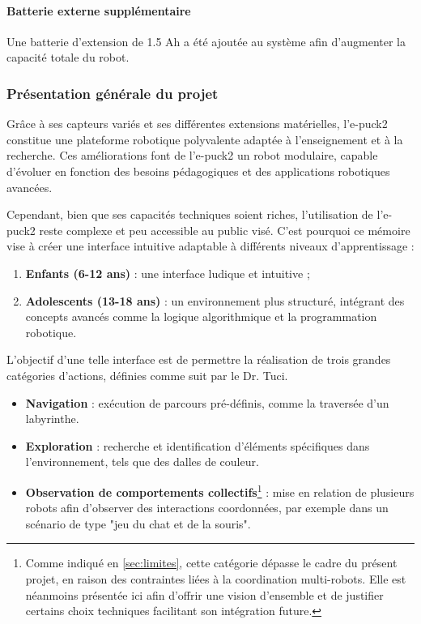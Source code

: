 \paragraph{Batterie externe supplémentaire}
Une batterie d'extension de 1.5 Ah a été ajoutée au système afin d'augmenter la capacité totale du robot.

\subsubsection{Présentation générale du projet}
Grâce à ses capteurs variés et ses différentes extensions matérielles, l'e-puck2 constitue une plateforme robotique polyvalente adaptée à l'enseignement et à la recherche.
Ces améliorations font de l'e-puck2 un robot modulaire, capable d'évoluer en fonction des besoins pédagogiques et des applications robotiques avancées.

Cependant, bien que ses capacités techniques soient riches, l'utilisation de l'e-puck2 reste complexe et peu accessible au public visé.
C'est pourquoi ce mémoire vise à créer une interface intuitive adaptable à différents niveaux d'apprentissage :
\begin{enumerate}
    \item \textbf{Enfants (6-12 ans)} : une interface ludique et intuitive ;
    \item \textbf{Adolescents (13-18 ans)} : un environnement plus structuré, intégrant des concepts avancés comme la logique algorithmique et la programmation robotique.
\end{enumerate}

L’objectif d'une telle interface est de permettre la réalisation de trois grandes catégories d’actions, définies comme suit par le Dr. Tuci.  

\begin{itemize}
    \item \textbf{Navigation} : exécution de parcours pré-définis, comme la traversée d’un labyrinthe.
    
    \item \textbf{Exploration} : recherche et identification d’éléments spécifiques dans l’environnement, tels que des dalles de couleur.
    
    \item \textbf{Observation de comportements collectifs}\footnote{Comme indiqué en \autoref{sec:limites}, cette catégorie dépasse le cadre du présent projet, en raison des contraintes liées à la coordination multi-robots. Elle est néanmoins présentée ici afin d’offrir une vision d’ensemble et de justifier certains choix techniques facilitant son intégration future.} : mise en relation de plusieurs robots afin d’observer des interactions coordonnées, par exemple dans un scénario de type "jeu du chat et de la souris".
\end{itemize}

